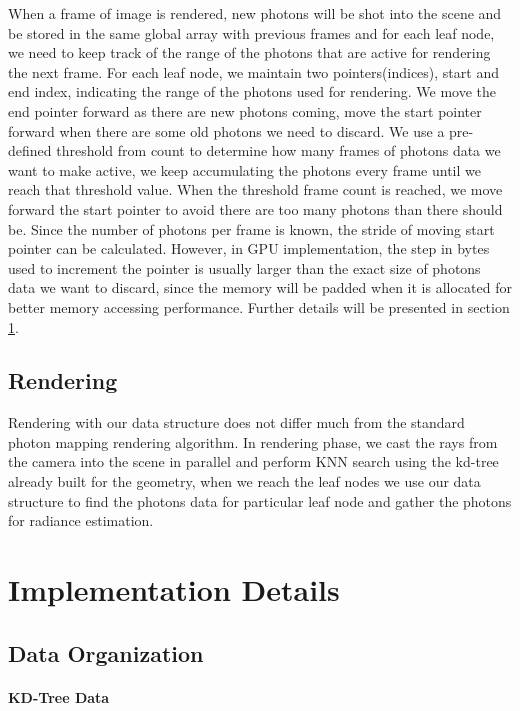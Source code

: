 When a frame of image is rendered, new photons will be shot into the scene and be stored in the same global array with previous frames and for each leaf node, we need to keep track of the range of the photons that are active for rendering the next frame. For each leaf node, we maintain two pointers(indices), start and end index, indicating the range of the photons used for rendering. We move the end pointer forward as there are new photons coming, move the start pointer forward when there are some old photons we need to discard. We use a pre-defined threshold from count to determine how many frames of photons data we want to make active, we keep accumulating the photons every frame until we reach that threshold value. When the threshold frame count
is reached, we move forward the start pointer to avoid there are too many photons than there should be. Since the number of photons per frame is known, the stride of moving start pointer can be calculated. However, in GPU implementation, the step in bytes used to increment the pointer is usually larger than the exact size of photons data we want to discard, since the memory will be padded when it is allocated for better memory accessing performance. Further details will be presented in section \ref{sec:impl_detials}.

\subsection{Rendering}

Rendering with our data structure does not differ much from the standard photon mapping rendering algorithm. In rendering phase, we cast the rays from the camera into the scene in parallel and perform KNN search using the kd-tree already built for the geometry, when we reach the leaf nodes we use our data structure to find the photons data for particular leaf node and gather the photons for radiance estimation.

\section{Implementation Details}
\label{sec:impl_detials}

\subsection{Data Organization}
\label{subsec:data_org}

\paragraph{KD-Tree Data}


